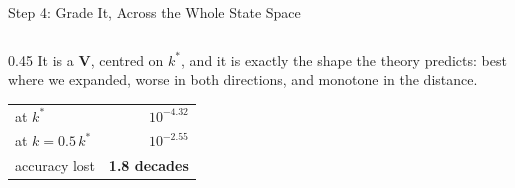 \begin{frame}{Step 4: Grade It, Across the Whole State Space}
\begin{columns}[T]
\begin{column}{0.45\textwidth}
It is a \textbf{V}, centred on $k^{*}$, and it is exactly the shape the theory predicts: best where we expanded, worse in both directions, and monotone in the distance.
\medskip

\begin{center}\footnotesize
\begin{tabularx}{\linewidth}{@{}>{\raggedright\arraybackslash}X r@{}}
\toprule
at $k^{*}$ & $10^{-4.32}$ \\
at $k=0.5\,k^{*}$ & $10^{-2.55}$ \\
\midrule
accuracy lost & \textbf{1.8 decades} \\
\bottomrule
\end{tabularx}
\end{center}
\end{column}
\end{columns}
\vspace{1mm}
\end{frame}

